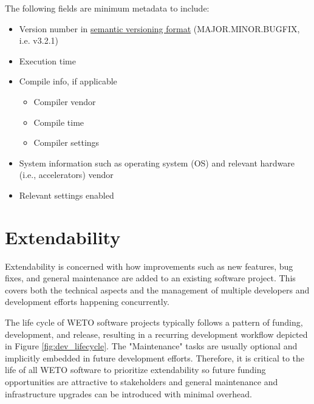 \documentclass[]{nrel}
\begin{document}
The following fields are minimum metadata to include:
\begin{itemize}
\item Version number in \href{https://semver.org}{semantic versioning format} (MAJOR.MINOR.BUGFIX, i.e. v3.2.1)
\item Execution time

\item Compile info, if applicable
\begin{itemize}
\item Compiler vendor
\item Compile time
\item Compiler settings
\end{itemize}

\item System information such as operating system (OS) and relevant hardware (i.e., accelerators) vendor
\item Relevant settings enabled

\end{itemize}


\chapter{Extendability}
\label{sec:extendability}
Extendability is concerned with how improvements such as new features, bug fixes, and general
maintenance are added to an existing software project. This covers both the technical aspects
and the management of multiple developers and development efforts happening
concurrently.

The life cycle of WETO software projects typically follows a pattern of funding,
development, and release, resulting in a recurring development workflow depicted in Figure \ref{fig:dev_lifecycle}.
The "Maintenance" tasks are usually optional and implicitly embedded
in future development efforts. Therefore, it is critical to the life of all WETO software to
prioritize extendability so future funding opportunities are attractive to stakeholders
and general maintenance and infrastructure upgrades can be introduced with minimal overhead.
\end{document}
